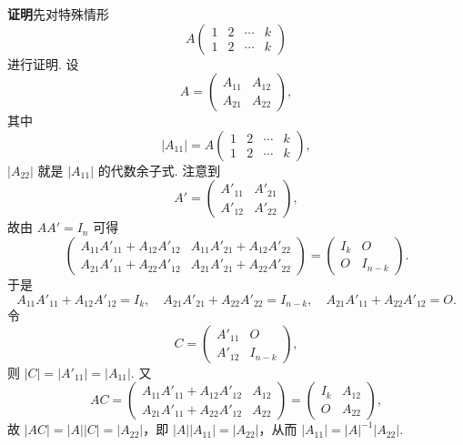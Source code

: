 \documentclass[UTF8, 12pt, fontset=fandol, oneside]{ctexart}
\begin{document}
\noindent\textbf{证明}\quad 先对特殊情形
\[
A\begin{pmatrix}
1&2&\cdots&k\\
1&2&\cdots&k
\end{pmatrix}
\]
进行证明. 设
\[
A=\begin{pmatrix}
A_{11}&A_{12}\\
A_{21}&A_{22}
\end{pmatrix},
\]
其中
\[
|A_{11}|=A\begin{pmatrix}
1&2&\cdots&k\\
1&2&\cdots&k
\end{pmatrix},
\]
$|A_{22}|$ 就是 $|A_{11}|$ 的代数余子式. 注意到
\[
A'=\begin{pmatrix}
A'_{11}&A'_{21}\\
A'_{12}&A'_{22}
\end{pmatrix},
\]
故由 $AA'=I_n$ 可得
\[
\begin{pmatrix}
A_{11}A'_{11}+A_{12}A'_{12}&A_{11}A'_{21}+A_{12}A'_{22}\\
A_{21}A'_{11}+A_{22}A'_{12}&A_{21}A'_{21}+A_{22}A'_{22}
\end{pmatrix}
=
\begin{pmatrix}
I_k&O\\
O&I_{n-k}
\end{pmatrix}.
\]
于是
\[
A_{11}A'_{11}+A_{12}A'_{12}=I_k,\quad
A_{21}A'_{21}+A_{22}A'_{22}=I_{n-k},\quad
A_{21}A'_{11}+A_{22}A'_{12}=O.
\]
令
\[
C=\begin{pmatrix}
A'_{11}&O\\
A'_{12}&I_{n-k}
\end{pmatrix},
\]
则 $|C|=|A'_{11}|=|A_{11}|$. 又
\[
AC=
\begin{pmatrix}
A_{11}A'_{11}+A_{12}A'_{12}&A_{12}\\
A_{21}A'_{11}+A_{22}A'_{12}&A_{22}
\end{pmatrix}
=
\begin{pmatrix}
I_k&A_{12}\\
O&A_{22}
\end{pmatrix},
\]
故 $|AC|=|A||C|=|A_{22}|$，即 $|A||A_{11}|=|A_{22}|$，从而 $|A_{11}|=|A|^{-1}|A_{22}|$.
\end{document}
